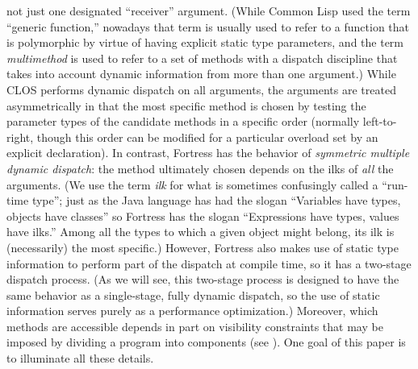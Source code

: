 not just one designated ``receiver'' argument.
(While Common Lisp used the term ``generic function,'' nowadays
that term is usually used to refer to a function that is polymorphic
by virtue of having explicit static type parameters, and
the term \emph{multimethod} is used to refer to a set of methods
with a dispatch discipline that takes into account dynamic information
from more than one argument.)
While CLOS performs dynamic dispatch on all arguments,
the arguments are treated asymmetrically in that the most specific
method is chosen by testing the parameter types of the candidate
methods in a specific order (normally left-to-right, though this order
can be modified for a particular overload set by an explicit declaration).
In contrast, Fortress has the behavior of \emph{symmetric multiple dynamic dispatch}:
the method ultimately chosen depends on the ilks of \emph{all} the arguments.
(We use the term \emph{ilk} for what is sometimes confusingly called a ``run-time type'';
just as the Java language has had the slogan ``Variables have types, objects have classes'' \cite[\S 4.5.5]{JLS1}
so Fortress has the slogan ``Expressions have types, values have ilks.''
Among all the types to which a given object might belong, its ilk
is (necessarily) the most specific.)
However, Fortress also makes use of static type information to perform part of the
dispatch at compile time, so it has a two-stage dispatch process.
(As we will see, this two-stage process is designed to have
the same behavior as a single-stage, fully dynamic dispatch,
so the use of static information serves purely as a performance optimization.)
Moreover, which methods are accessible depends in part
on visibility constraints that may be imposed by dividing a program
into components (see ).
One goal of this paper is to illuminate all these details.

